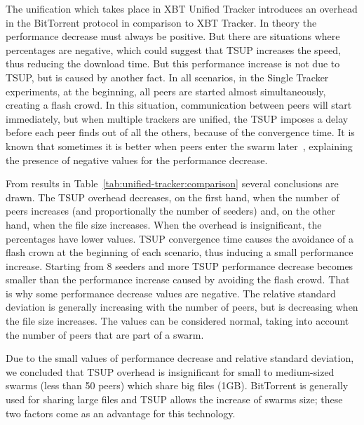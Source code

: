 The unification which takes place in XBT Unified Tracker introduces an
overhead in the BitTorrent protocol in comparison to XBT Tracker. In theory
the performance decrease must always be positive. But there are situations
where percentages are negative, which could suggest that TSUP increases
the speed, thus reducing the download time. But this performance increase is
not due to TSUP, but is caused by another fact. In all scenarios, in the
Single Tracker experiments, at the beginning, all peers are started almost
simultaneously, creating a flash crowd. In this situation, communication
between peers will start immediately, but when multiple trackers are unified,
the TSUP imposes a delay before each peer finds out of all the others, because
of the convergence time.  It is known that sometimes it is better when peers
enter the swarm later~\cite{bt-analysis}, explaining the presence of negative
values for the performance decrease.




From results in Table~\ref{tab:unified-tracker:comparison} several
conclusions are drawn.  The TSUP overhead decreases, on the
first hand, when the number of peers increases (and proportionally the number
of seeders) and, on the other hand, when the file size increases. When the
overhead is insignificant, the percentages have lower values. TSUP convergence
time causes the avoidance of a flash crown at the beginning of each scenario,
thus inducing a small performance increase. Starting from 8 seeders and more
TSUP performance decrease becomes smaller than the performance increase caused
by avoiding the flash crowd. That is why some performance decrease values are
negative. The relative standard deviation is generally increasing with the
number of peers, but is decreasing when the file size increases. The values
can be considered normal, taking into account the number of peers that are
part of a swarm.

Due to the small values of performance decrease and relative standard
deviation, we concluded that TSUP overhead is insignificant for small to
medium-sized swarms (less than 50 peers) which share big files (1GB).
BitTorrent is generally used for sharing large files and TSUP allows the
increase of swarms size; these two factors come as an advantage for this
technology.

